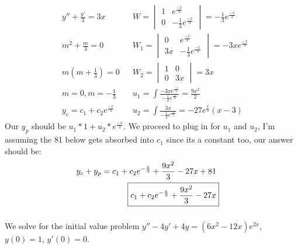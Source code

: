 \documentclass{article}
\begin{document}
\begin{align*}
    & y'' + \frac{y'}{3} = 3x  && W =  
    \begin{vmatrix}
        1 & e^{\frac{-x}{3}} \\
        0 & -\frac{1}{3}e^{\frac{-x}{3}} 
    \end{vmatrix} = -\frac{1}{3}e^{\frac{-x}{3}} 
    \\
    & m^2 + \frac{m}{3} = 0 && W_1 =
    \begin{vmatrix}
        0 & e^{\frac{-x}{3}} \\
        3x & -\frac{1}{3}e^{\frac{-x}{3}} 
    \end{vmatrix} = -3xe^{\frac{-x}{3}}  
    \\
    & m(m + \frac{1}{3}) = 0 && W_2 =
    \begin{vmatrix}
        1 & 0 \\
        0 & 3x 
    \end{vmatrix} = 3x 
    \\
    & m = 0, m = -\frac{1}{3} && u_1 = \int \frac{-3xe^{\frac{-x}{3}}}{-\frac{1}{3}e^{\frac{-x}{3}}} = \frac{9x^2}{2} \\
    & y_c = c_1 + c_2e^{\frac{-x}{3}} && u_2 = \int \frac{3x}{-\frac{1}{3} e^{\frac{-x}{3}}} = -27e^{\frac{x}{3}}(x-3)
\end{align*}
Our $y_p $ should be $u_1*1 + u_2 * e^{\frac{-x}{3}}$. We proceed to plug in for $u_1$ and $u_2$, 
I'm assuming the 81 below gets absorbed into $c_1$ since its a constant too, our answer should be: 
\begin{align*}
    y_c + y_p = c_1 + c_2e^{-\frac{x}{3}} + \frac{9x^2}{3} - 27x + 81 \\
    \Aboxed{c_1 + c_2e^{-\frac{x}{3}} + \frac{9x^2}{3} - 27x}
\end{align*}
\subsubsection{}
We solve for the initial value problem $y'' - 4y' + 4y = (6x^2 - 12x)e^{2x}$, $y(0) = 1$, $y'(0) = 0$. 
\end{document}
